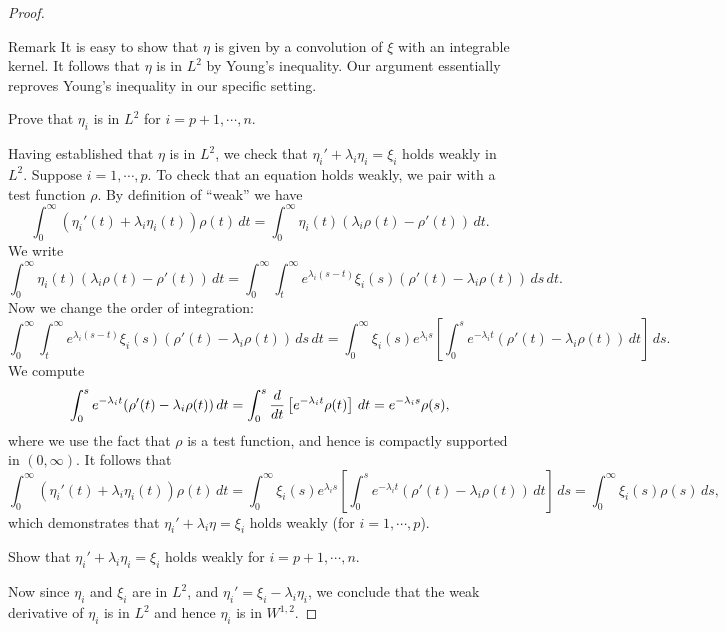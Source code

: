 \documentclass{amsart}
\begin{document}
\begin{proof}
  \begin{clear}{Remark}
    It is easy to show that $\eta$ is given by a convolution of $\xi$ with an integrable kernel. It follows that $\eta$ is in $L^{2}$ by Young's inequality. Our argument essentially reproves Young's inequality in our specific setting. 
  \end{clear}

  \begin{xca}
    Prove that $\eta_{i}$ is in $L^{2}$ for $i=p+1,\cdots,n$.   
  \end{xca}

  Having established that $\eta$ is in $L^{2}$, we check that $\eta_{i}'+\lambda_{i}\eta_{i}=\xi_{i}$ holds weakly in $L^{2}$. Suppose $i=1,\cdots,p$. To check that an equation holds weakly, we pair with a test function $\rho$. By definition of ``weak'' we have
  \begin{equation*}
    \int_{0}^{\infty}(\eta_{i}'(t)+\lambda_{i}\eta_{i}(t))\rho(t)\,dt=\int_{0}^{\infty}\eta_{i}(t)(\lambda_{i}\rho(t)-\rho'(t))\,dt.
  \end{equation*}
  We write
  \begin{equation*}
    \int_{0}^{\infty}\eta_{i}(t)(\lambda_{i}\rho(t)-\rho'(t))\,dt=\int_{0}^{\infty}\int_{t}^{\infty}e^{\lambda_{i}(s-t)}\xi_{i}(s)(\rho'(t)-\lambda_{i}\rho(t))\,ds\,dt.
  \end{equation*}
  Now we change the order of integration:
  \begin{equation*}   \int_{0}^{\infty}\int_{t}^{\infty}e^{\lambda_{i}(s-t)}\xi_{i}(s)(\rho'(t)-\lambda_{i}\rho(t))\,ds\,dt=\int_{0}^{\infty}\xi_{i}(s)e^{\lambda_{i}s}\left[\int_{0}^{s}e^{-\lambda_{i}t}(\rho'(t)-\lambda_{i}\rho(t))\,dt\right]\,ds.
  \end{equation*}
  We compute
  \begin{equation*}
    \int_{0}^{s}e^{-\lambda_{i}t}(\rho'(t)-\lambda_{i}\rho(t))\,dt=\int_{0}^{s}\frac{d}{dt}\left[e^{-\lambda_{i}t}\rho(t)\right]\,dt=e^{-\lambda_{i}s}\rho(s),
  \end{equation*}
  where we use the fact that $\rho$ is a test function, and hence is compactly supported in $(0,\infty)$. It follows that
  \begin{equation*}
    \int_{0}^{\infty}(\eta_{i}'(t)+\lambda_{i}\eta_{i}(t))\rho(t)\,dt=\int_{0}^{\infty}\xi_{i}(s)e^{\lambda_{i}s}\left[\int_{0}^{s}e^{-\lambda_{i}t}(\rho'(t)-\lambda_{i}\rho(t))\,dt\right]\,ds=\int_{0}^{\infty}\xi_{i}(s)\rho(s)\,ds,
  \end{equation*}
  which demonstrates that $\eta_{i}'+\lambda_{i}\eta=\xi_{i}$ holds weakly (for $i=1,\cdots,p$).
  \begin{xca}
    Show that $\eta_{i}'+\lambda_{i}\eta_{i}=\xi_{i}$ holds weakly for $i=p+1,\cdots,n$.
  \end{xca}
  Now since $\eta_{i}$ and $\xi_{i}$ are in $L^{2}$, and $\eta_{i}'=\xi_{i}-\lambda_{i}\eta_{i}$, we conclude that the weak derivative of $\eta_{i}$ is in $L^{2}$ and hence $\eta_{i}$ is in $W^{1,2}$.


\end{proof}
\end{document}
